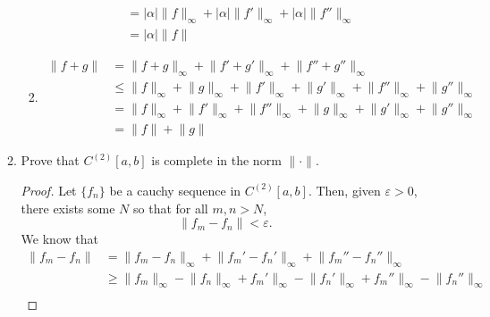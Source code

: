 \documentclass{article}
\begin{document}
\begin{enumerate}
\begin{enumerate}
\begin{enumerate}
\begin{align*}
                                                                & = \lvert\alpha\rvert\lVert f\rVert_\infty + \lvert\alpha\rvert\lVert f'\rVert_\infty + \lvert\alpha\rvert\lVert f''\rVert_\infty \\
                                                                & = \lvert\alpha\rvert\lVert f\rVert
                                    \end{align*}
                              \item \begin{align*}
                                          \lVert f+g\rVert & = \lVert f+g\rVert_\infty + \lVert f'+g'\rVert_\infty + \lVert f''+g''\rVert_\infty                                                                   \\
                                                           & \leq \lVert f\rVert_\infty+\lVert g\rVert_\infty + \lVert f'\rVert_\infty+\lVert g'\rVert_\infty + \lVert f''\rVert_\infty+\lVert g''\rVert_\infty    \\
                                                           & = \lVert f\rVert_\infty + \lVert f'\rVert_\infty + \lVert f''\rVert_\infty + \lVert g\rVert_\infty + \lVert g'\rVert_\infty + \lVert g''\rVert_\infty \\
                                                           & = \lVert f\rVert + \lVert g\rVert
                                    \end{align*}
                        \end{enumerate}
                  \item Prove that $C^{(2)}[a,b]$ is complete in the norm
                        $\lVert\cdot\rVert$.
                        \begin{proof}
                              Let $\{f_n\}$ be a cauchy sequence in $C^{(2)}[a,b]$. Then,
                              given $\varepsilon>0$, there exists some $N$ so that
                              for all $m,n>N$,
                              \[
                                    \lVert f_m-f_n\rVert < \varepsilon.
                              \]
                              We know that
                              \begin{align*}
                                    \lVert f_m-f_n\rVert & = \lVert f_m - f_n\rVert_\infty + \lVert f_m' - f_n'\rVert_\infty + \lVert f_m'' - f_n''\rVert_\infty                                                  \\
                                                         & \geq \lVert f_m\rVert_\infty - \lVert f_n\rVert_\infty + f_m'\rVert_\infty - \lVert f_n'\rVert_\infty + f_m''\rVert_\infty - \lVert f_n''\rVert_\infty \\

\end{align*}
\end{proof}
\end{enumerate}
\end{enumerate}
\end{document}
